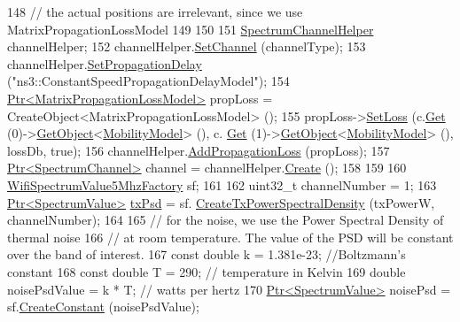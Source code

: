 \begin{DoxyCode}
148   \textcolor{comment}{// the actual positions are irrelevant, since we use MatrixPropagationLossModel}
149 
150 
151   \hyperlink{classns3_1_1SpectrumChannelHelper}{SpectrumChannelHelper} channelHelper;
152   channelHelper.\hyperlink{classns3_1_1SpectrumChannelHelper_a11ffe86edea8cdd30f181e41c0e3e29f}{SetChannel} (channelType);
153   channelHelper.\hyperlink{classns3_1_1SpectrumChannelHelper_a61788598e0bcb0ac0d0530970a0fca2c}{SetPropagationDelay} (\textcolor{stringliteral}{"ns3::ConstantSpeedPropagationDelayModel"});
154   \hyperlink{classns3_1_1Ptr}{Ptr<MatrixPropagationLossModel>} propLoss = 
      CreateObject<MatrixPropagationLossModel> ();
155   propLoss->\hyperlink{classns3_1_1MatrixPropagationLossModel_a16fd1f9be7b7246423818632d710947d}{SetLoss} (c.\hyperlink{classns3_1_1NodeContainer_a9ed96e2ecc22e0f5a3d4842eb9bf90bf}{Get} (0)->\hyperlink{classns3_1_1Object_a13e18c00017096c8381eb651d5bd0783}{GetObject}<\hyperlink{classns3_1_1MobilityModel}{MobilityModel}> (), c.
      \hyperlink{classns3_1_1NodeContainer_a9ed96e2ecc22e0f5a3d4842eb9bf90bf}{Get} (1)->\hyperlink{classns3_1_1Object_a13e18c00017096c8381eb651d5bd0783}{GetObject}<\hyperlink{classns3_1_1MobilityModel}{MobilityModel}> (), lossDb, \textcolor{keyword}{true});
156   channelHelper.\hyperlink{classns3_1_1SpectrumChannelHelper_ab23845170770bda5be7ee8a2b42c452b}{AddPropagationLoss} (propLoss);
157   \hyperlink{classns3_1_1Ptr}{Ptr<SpectrumChannel>} channel = channelHelper.\hyperlink{classns3_1_1SpectrumChannelHelper_a419ea84f5046763085f94f38af319fb9}{Create} ();
158 
159 
160   \hyperlink{classns3_1_1WifiSpectrumValue5MhzFactory}{WifiSpectrumValue5MhzFactory} sf;
161 
162   uint32\_t channelNumber = 1;
163   \hyperlink{classns3_1_1Ptr}{Ptr<SpectrumValue>} \hyperlink{lte__link__budget_8m_a684fe3101a5e48a5fcc57cab8dbcd1aa}{txPsd} =  sf.
      \hyperlink{classns3_1_1WifiSpectrumValue5MhzFactory_aa3045151889d535e6e7bf40e0855a92f}{CreateTxPowerSpectralDensity} (txPowerW, channelNumber);
164 
165   \textcolor{comment}{// for the noise, we use the Power Spectral Density of thermal noise}
166   \textcolor{comment}{// at room temperature. The value of the PSD will be constant over the band of interest.}
167   \textcolor{keyword}{const} \textcolor{keywordtype}{double} k = 1.381e-23; \textcolor{comment}{//Boltzmann's constant}
168   \textcolor{keyword}{const} \textcolor{keywordtype}{double} T = 290; \textcolor{comment}{// temperature in Kelvin}
169   \textcolor{keywordtype}{double} noisePsdValue = k * T; \textcolor{comment}{// watts per hertz}
170   \hyperlink{classns3_1_1Ptr}{Ptr<SpectrumValue>} noisePsd = sf.\hyperlink{classns3_1_1WifiSpectrumValue5MhzFactory_a32a04dc83a836da0fcfcc387cabc097f}{CreateConstant} (noisePsdValue);

\end{DoxyCode}
